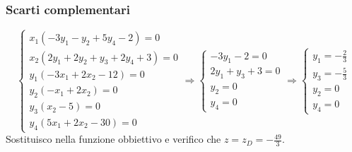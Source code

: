 \documentclass[\main/main.tex]{subfiles}
\begin{document}
\subsubsection*{Scarti complementari}
\[
  \begin{cases}
    x_1 (-3y_1 -y_2 +5y_4-2) = 0          \\
    x_2 (2y_1 + 2y_2 + y_3 + 2y_4 +3) = 0 \\
    y_1 (-3x_1 + 2x_2 - 12) = 0           \\
    y_2 (-x_1 + 2x_2) = 0                 \\
    y_3 (x_2 - 5) = 0                     \\
    y_4 (5x_1 + 2x_2 - 30) = 0
  \end{cases}
  \Rightarrow
  \begin{cases}
    -3y_1 -2 = 0      \\
    2y_1 + y_3 +3 = 0 \\
    y_2  = 0          \\
    y_4  = 0
  \end{cases}
  \Rightarrow
  \begin{cases}
    y_1 = -\frac{2}{3} \\
    y_3= -\frac{5}{3}  \\
    y_2  = 0           \\
    y_4  = 0
  \end{cases}
\]
Sostituisco nella funzione obbiettivo e verifico che $z = z_D = -\frac{49}{3}$.
\end{document}
